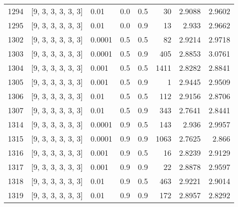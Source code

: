 \begin{longtable}{lllrrrrr}
 1294 & [9, 3, 3, 3, 3, 3] &                        0.01 &      0.0 & 0.5 &   30 &   2.9088 &   2.9602 \\
 1295 & [9, 3, 3, 3, 3, 3] &                        0.01 &      0.0 & 0.9 &   13 &    2.933 &   2.9662 \\
 1302 & [9, 3, 3, 3, 3, 3] &                      0.0001 &      0.5 & 0.5 &   82 &   2.9214 &   2.9718 \\
 1303 & [9, 3, 3, 3, 3, 3] &                      0.0001 &      0.5 & 0.9 &  405 &   2.8853 &   3.0761 \\
 1304 & [9, 3, 3, 3, 3, 3] &                       0.001 &      0.5 & 0.5 & 1411 &   2.8282 &   2.8841 \\
 1305 & [9, 3, 3, 3, 3, 3] &                       0.001 &      0.5 & 0.9 &    1 &   2.9445 &   2.9509 \\
 1306 & [9, 3, 3, 3, 3, 3] &                        0.01 &      0.5 & 0.5 &  112 &   2.9156 &   2.8706 \\
 1307 & [9, 3, 3, 3, 3, 3] &                        0.01 &      0.5 & 0.9 &  343 &   2.7641 &   2.8441 \\
 1314 & [9, 3, 3, 3, 3, 3] &                      0.0001 &      0.9 & 0.5 &  143 &    2.936 &   2.9957 \\
 1315 & [9, 3, 3, 3, 3, 3] &                      0.0001 &      0.9 & 0.9 & 1063 &   2.7625 &    2.866 \\
 1316 & [9, 3, 3, 3, 3, 3] &                       0.001 &      0.9 & 0.5 &   16 &   2.8239 &   2.9129 \\
 1317 & [9, 3, 3, 3, 3, 3] &                       0.001 &      0.9 & 0.9 &   22 &   2.8878 &   2.9597 \\
 1318 & [9, 3, 3, 3, 3, 3] &                        0.01 &      0.9 & 0.5 &  463 &   2.9221 &   2.9014 \\
 1319 & [9, 3, 3, 3, 3, 3] &                        0.01 &      0.9 & 0.9 &  172 &   2.8957 &   2.8292 \\
\end{longtable}
